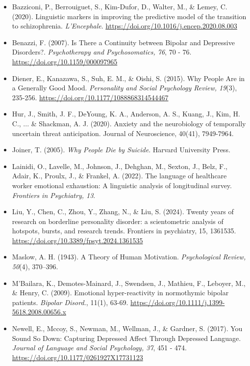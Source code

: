 \documentclass[11pt]{article}
\begin{document}
\begin{itemize}
    \item Bazziconi, P., Berrouiguet, S., Kim-Dufor, D., Walter, M., \& Lemey, C. (2020). Linguistic markers in improving the predictive model of the transition to schizophrenia. \textit{L'Encephale}. \url{https://doi.org/10.1016/j.encep.2020.08.003}
    \item Benazzi, F. (2007). Is There a Continuity between Bipolar and Depressive Disorders?. \textit{Psychotherapy and Psychosomatics, 76}, 70 - 76. \url{https://doi.org/10.1159/000097965}
    \item Diener, E., Kanazawa, S., Suh, E. M., \& Oishi, S. (2015). Why People Are in a Generally Good Mood. \textit{Personality and Social Psychology Review, 19}(3), 235-256. \url{https://doi.org/10.1177/1088868314544467}
    \item Hur, J., Smith, J. F., DeYoung, K. A., Anderson, A. S., Kuang, J., Kim, H. C., ... \& Shackman, A. J. (2020). Anxiety and the neurobiology of temporally uncertain threat anticipation. Journal of Neuroscience, 40(41), 7949-7964. 
    \item Joiner, T. (2005). \textit{Why People Die by Suicide}. Harvard University Press.
    \item Lainidi, O., Lavelle, M., Johnson, J., Dehghan, M., Sexton, J., Belz, F., Adair, K., Proulx, J., \& Frankel, A. (2022). The language of healthcare worker emotional exhaustion: A linguistic analysis of longitudinal survey. \textit{Frontiers in Psychiatry, 13}.
    \item Liu, Y., Chen, C., Zhou, Y., Zhang, N., \& Liu, S. (2024). Twenty years of research on borderline personality disorder: a scientometric analysis of hotspots, bursts, and research trends. Frontiers in psychiatry, 15, 1361535. \url {https://doi.org/10.3389/fpsyt.2024.1361535}
    \item Maslow, A. H. (1943). A Theory of Human Motivation. \textit{Psychological Review, 50}(4), 370–396.
    \item M'Bailara, K., Demotes-Mainard, J., Swendsen, J., Mathieu, F., Leboyer, M., \& Henry, C. (2009). Emotional hyper-reactivity in normothymic bipolar patients. \textit{Bipolar Disord.}, 11(1), 63-69. \url{https://doi.org/10.1111/j.1399-5618.2008.00656.x} 
    \item Newell, E., Mccoy, S., Newman, M., Wellman, J., \& Gardner, S. (2017). You Sound So Down: Capturing Depressed Affect Through Depressed Language. \textit{Journal of Language and Social Psychology, 37}, 451 - 474. \url{https://doi.org/10.1177/0261927X17731123}

\end{itemize}
\end{document}
